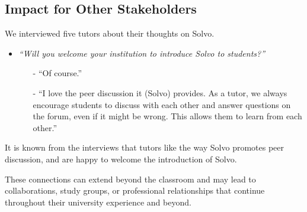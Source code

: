 \documentclass[a4paper]{article}
\begin{document}
    \subsection*{Impact for Other Stakeholders}

    We interviewed five tutors about their thoughts on Solvo.

    \begin{itemize}
        \item \textit{``Will you welcome your institution to introduce Solvo to students?''}
        \begin{itemize}
            \item[-] ``Of course.''
            \item[-] ``I love the peer discussion it (Solvo) provides.
            As a tutor, we always encourage students to discuss with each other and answer questions on the forum, even if it might be wrong.
            This allows them to learn from each other.''
        \end{itemize}
    \end{itemize}

    It is known from the interviews that tutors like the way Solvo promotes peer discussion, and are happy to welcome the introduction of Solvo.

    These connections can extend beyond the classroom and may lead to collaborations, study groups, or professional relationships that continue throughout their university experience and beyond.
\end{document}
